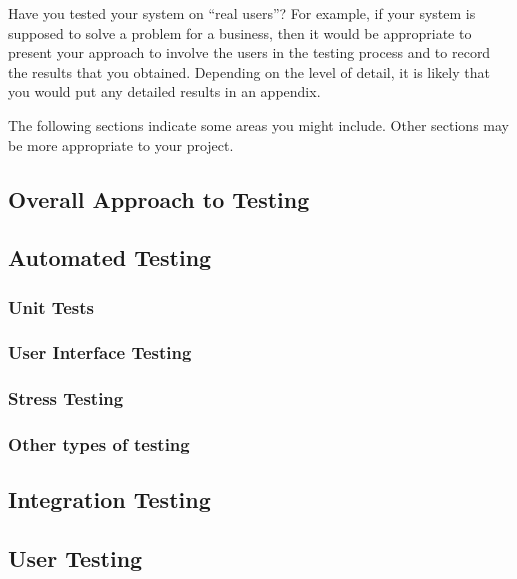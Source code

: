 Have you tested your system on ``real users''? For example, if your system is supposed to solve a problem for a business, then it would be appropriate to present your approach to involve the users in the testing process and to record the results that you obtained. Depending on the level of detail, it is likely that you would put any detailed results in an appendix.

The following sections indicate some areas you might include. Other sections may be more appropriate to your project. 

\subsection{Overall Approach to Testing}

\subsection{Automated Testing}

\subsubsection{Unit Tests}

\subsubsection{User Interface Testing}

\subsubsection{Stress Testing}

\subsubsection{Other types of testing}

\subsection{Integration Testing}

\subsection{User Testing}

